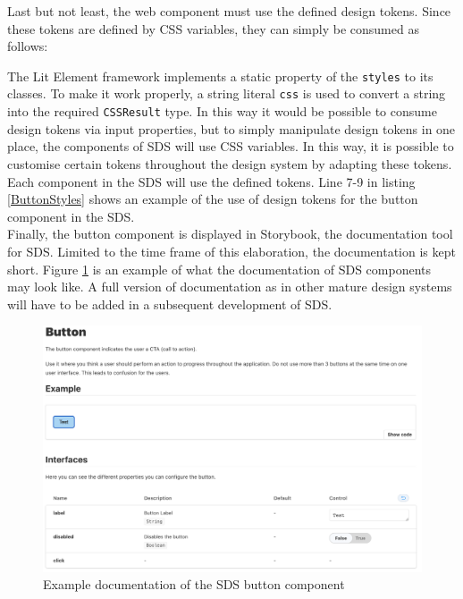 Last but not least, the web component must use the defined design tokens. Since these tokens are defined by CSS variables, they can simply be consumed as follows: 

The Lit Element framework implements a static property of the \texttt{styles} to its classes. To make it work properly, a string literal \texttt{css} is used to convert a string into the required \texttt{CSSResult} type. In this way it would be possible to consume design tokens via input properties, but to simply manipulate design tokens in one place, the components of \ac{SDS} will use CSS variables. In this way, it is possible to customise certain tokens throughout the design system by adapting these tokens. Each component in the \ac{SDS} will use the defined tokens. Line 7-9 in listing \ref{ButtonStyles} shows an example of the use of design tokens for the button component in the \ac{SDS}. \\
Finally, the button component is displayed in Storybook, the documentation tool for \ac{SDS}. Limited to the time frame of this elaboration, the documentation is kept short. Figure \ref{storybook_button} is an example of what the documentation of \ac{SDS} components may look like. A full version of documentation as in other mature design systems will have to be added in a subsequent development of \ac{SDS}. \\
\begin{figure}[htbp]
    \centerline{\includegraphics[width=\linewidth]{images/storybook_button.png}}
    \caption{Example documentation of the \ac{SDS} button component}
    \label{storybook_button}
\end{figure}
